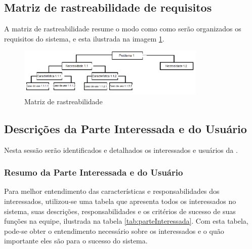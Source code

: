 \subsection{Matriz de rastreabilidade de requisitos}

A matriz de rastreabilidade resume o modo como como serão organizados os requisitos do sistema, e esta ilustrada na imagem \ref{img:rastreabilidade}.

\begin{figure}[H]
	\centering
	\includegraphics[width=0.8\textwidth]{imgModelagem/diagrama}
	\caption{Matriz de rastreabilidade}
	\label{img:rastreabilidade}
\end{figure}


\subsection{Descrições da Parte Interessada e do Usuário}

Nesta sessão serão identificados e detalhados os interessados e usuários da \nomeferramenta{}.

\subsubsection{Resumo da Parte Interessada e do Usuário}

Para melhor entendimento das características e responsabilidades dos interessados, utilizou-se uma tabela que apresenta todos os interessados no sistema, suas descrições, responsabilidades e os critérios de sucesso de suas funções na equipe, ilustrada na tabela \ref{tab:parteInteressada}. Com esta tabela, pode-se obter o entendimento necessário sobre os interessados e o quão importante eles são para o sucesso do sistema.

